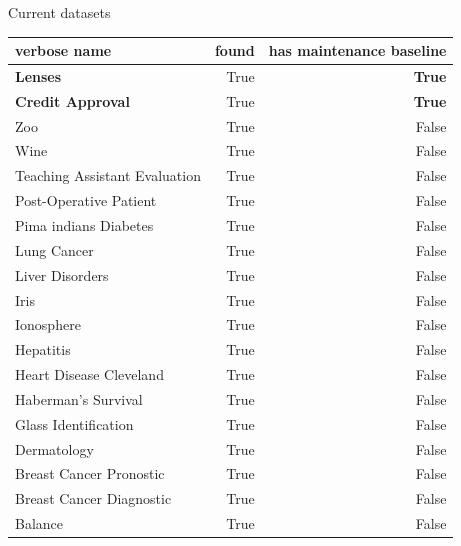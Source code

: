 \documentclass[]{beamer}
\begin{document}
\begin{frame}{Current datasets}
    \centering
    \smaller
    \begin{tabular}{lrr}
        \toprule
        verbose name & found & has maintenance baseline \\\midrule
        \textbf{Lenses} & True & \textbf{True} \\
        \textbf{Credit Approval} & True & \textbf{True} \\
        Zoo & True & False \\
        Wine & True & False \\
        Teaching Assistant Evaluation & True & False \\
        Post-Operative Patient & True & False \\
        Pima indians Diabetes & True & False \\
        Lung Cancer & True & False \\
        Liver Disorders & True & False \\
        Iris & True & False \\
        Ionosphere & True & False \\
        Hepatitis & True & False \\
        Heart Disease Cleveland & True & False \\
        Haberman's Survival & True & False \\
        Glass Identification & True & False \\
        Dermatology & True & False \\
        Breast Cancer Pronostic & True & False \\
        Breast Cancer Diagnostic & True & False \\
        Balance & True & False \\\bottomrule
    \end{tabular}
\end{frame}
\end{document}

